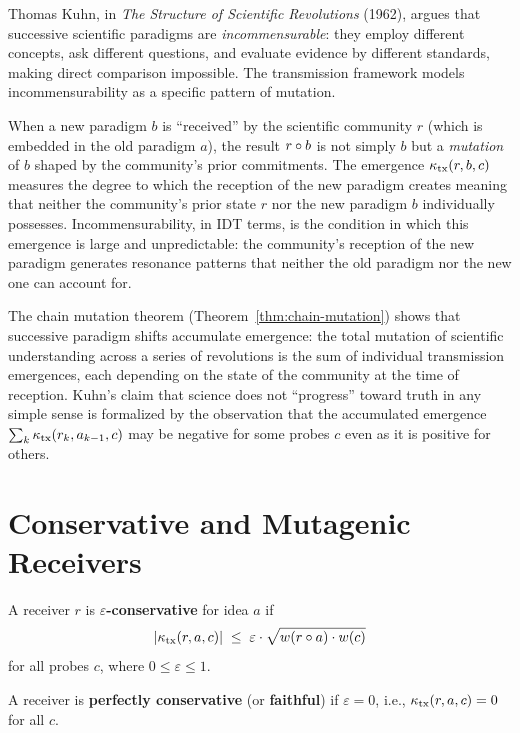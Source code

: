 \begin{interpretation}\label{interp:ch7:kuhn_incommensurability}
Thomas Kuhn, in \emph{The Structure of Scientific Revolutions} (1962),
argues that successive scientific paradigms are \emph{incommensurable}:
they employ different concepts, ask different questions, and evaluate
evidence by different standards, making direct comparison impossible.
The transmission framework models incommensurability as a specific
pattern of mutation.

When a new paradigm $b$ is ``received'' by the scientific community $r$
(which is embedded in the old paradigm $a$), the result $r \circ b$
is not simply $b$ but a \emph{mutation} of $b$ shaped by the community's
prior commitments. The emergence $\kappa_{\text{tx}}(r, b, c)$ measures
the degree to which the reception of the new paradigm creates meaning
that neither the community's prior state $r$ nor the new paradigm $b$
individually possesses. Incommensurability, in IDT terms, is the condition
in which this emergence is large and unpredictable: the community's
reception of the new paradigm generates resonance patterns that neither
the old paradigm nor the new one can account for.

The chain mutation theorem (Theorem~\ref{thm:chain-mutation}) shows that
successive paradigm shifts accumulate emergence: the total mutation of
scientific understanding across a series of revolutions is the sum of
individual transmission emergences, each depending on the state of the
community at the time of reception. Kuhn's claim that science does not
``progress'' toward truth in any simple sense is formalized by the
observation that the accumulated emergence $\sum_k \kappa_{\text{tx}}
(r_k, a_{k-1}, c)$ may be negative for some probes $c$ even as it is
positive for others.
\end{interpretation}

\section{Conservative and Mutagenic Receivers}

\begin{definition}\label{def:conservative}
A receiver $r$ is \textbf{$\varepsilon$-conservative} for idea $a$ if
\[
    |\kappa_{\mathrm{tx}}(r, a, c)| \;\leq\; \varepsilon \cdot
    \sqrt{w(r \circ a) \cdot w(c)}
\]
for all probes $c$, where $0 \leq \varepsilon \leq 1$.

A receiver is \textbf{perfectly conservative} (or \textbf{faithful}) if
$\varepsilon = 0$, i.e., $\kappa_{\mathrm{tx}}(r, a, c) = 0$ for all
$c$.
\end{definition}

